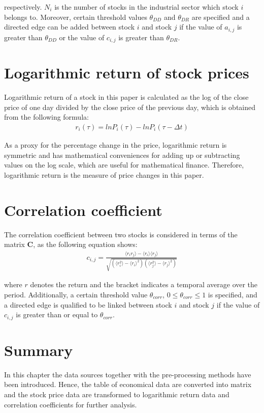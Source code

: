 respectively. $N_i$ is the number of stocks in the industrial sector which stock $i$ belongs to. Moreover, certain threshold values $\theta_{DD}$ and $\theta_{DR}$ are specified and a directed edge can be added between stock $i$ and stock $j$ if the value of $a_{i,j}$ is greater than $\theta_{DD}$ or the value of $c_{i,j}$ is greater than $\theta_{DR}$.

\section{Logarithmic return of stock prices}
Logarithmic return of a stock in this paper is calculated as the log of the close price of one day divided by the close price of the previous day, which is obtained from the following formula:
\begin{eqnarray}\label{equ:log}
r_i(\tau)=lnP_i(\tau)-lnP_i(\tau-\Delta t)
\end{eqnarray}

As a proxy for the percentage change in the price, logarithmic return is symmetric and has mathematical conveniences for adding up or subtracting values on the log scale, which are useful for mathematical finance. Therefore, logarithmic return is the measure of price changes in this paper.

\section{Correlation coefficient}
The correlation coefficient between two stocks is considered in terms of the matrix \textbf{C}, as the following equation shows:
\begin{eqnarray}\label{equ:corr}
c_{i,j}=\frac{\langle r_ir_j \rangle-\langle r_i\rangle \langle r_j\rangle}{\sqrt{(\langle r_i^2\rangle-\langle r_i\rangle^2)(\langle r_j^2\rangle-\langle r_j\rangle^2)}}
\end{eqnarray}

where $r$ denotes the return and the bracket indicates a temporal average over the period. Additionally, a certain threshold value $\theta_{corr}$, $0\leq \theta_{corr} \leq1$ is specified, and a directed edge is qualified to be linked between stock $i$ and stock $j$ if the value of $c_{i,j}$ is greater than or equal to $\theta_{corr}$.

\section{Summary}
In this chapter the data sources together with the pre-processing methods have been introduced. Hence, the table of economical data are converted into matrix and the stock price data are transformed to logarithmic return data and correlation coefficients for further analysis.